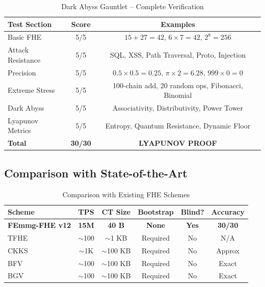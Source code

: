 \documentclass{article}
\begin{document}
\begin{table}[H]
\centering
\begin{tabular}{|l|c|c|}
\hline
\textbf{Test Section} & \textbf{Score} & \textbf{Examples} \\
\hline
Basic FHE & 5/5 & $15+27=42$, $6\times7=42$, $2^8=256$ \\
Attack Resistance & 5/5 & SQL, XSS, Path Traversal, Proto, Injection \\
Precision & 5/5 & $0.5\times0.5=0.25$, $\pi\times2=6.28$, $999\times0=0$ \\
Extreme Stress & 5/5 & 100-chain add, 20 random ops, Fibonacci, Binomial \\
Dark Abyss & 5/5 & Associativity, Distributivity, Power Tower \\
Lyapunov Metrics & 5/5 & Entropy, Quantum Resistance, Dynamic Floor \\
\hline
\textbf{Total} & \textbf{30/30} & \textbf{LYAPUNOV PROOF} \\
\hline
\end{tabular}
\caption{Dark Abyss Gauntlet -- Complete Verification}
\label{tab:darkabyss}
\end{table}

\subsection{Comparison with State-of-the-Art}

\begin{table}[H]
\centering
\begin{tabular}{|l|c|c|c|c|c|}
\hline
\textbf{Scheme} & \textbf{TPS} & \textbf{CT Size} & \textbf{Bootstrap} & \textbf{Blind?} & \textbf{Accuracy} \\
\hline
\textbf{FEmmg-FHE v12} & \textbf{15M} & \textbf{40 B} & \textbf{None} & \textbf{Yes} & \textbf{30/30} \\
TFHE \cite{chillotti2020} & $\sim$100 & $\sim$1 KB & Required & No & N/A \\
CKKS \cite{cheon2017} & $\sim$1K & $\sim$100 KB & Required & No & Approx \\
BFV \cite{fan2012} & $\sim$100 & $\sim$100 KB & Required & No & Exact \\
BGV \cite{brakerski2014} & $\sim$100 & $\sim$100 KB & Required & No & Exact \\
\hline
\end{tabular}
\caption{Comparison with Existing FHE Schemes}
\label{tab:comparison}
\end{table}
\end{document}
